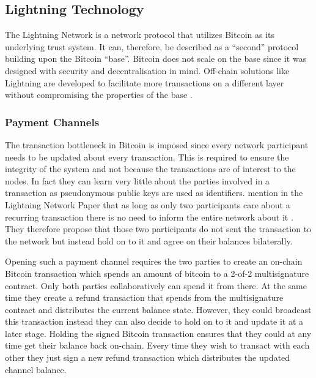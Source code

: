 \documentclass[final]{fhnwreport}       %
\begin{document}
\subsection{Lightning Technology}
The Lightning Network is a network protocol that utilizes Bitcoin as its underlying trust system. It can, therefore, be described as a ``\gls{second}'' protocol building upon the Bitcoin ``\gls{base}''. Bitcoin does not scale on the \gls{base} since it was designed with security and decentralisation in mind. Off-chain solutions like Lightning are developed to facilitate more transactions on a different layer without compromising the properties of the \gls{base} \citep{poon_bitcoin_2016}.

\subsubsection{Payment Channels}
The transaction bottleneck in Bitcoin is imposed since every network participant needs to be updated about every transaction. This is required to ensure the integrity of the system and not because the transactions are of interest to the nodes. In fact they can learn very little about the parties involved in a transaction as pseudonymous public keys are used as identifiers. \citeauthor{poon_bitcoin_2016} mention in the Lightning Network Paper that as long as only two participants care about a recurring transaction there is no need to inform the entire network about it \citep{poon_bitcoin_2016}. They therefore propose that those two participants do not sent the transaction to the network but instead hold on to it and agree on their balances bilaterally. 

Opening such a payment channel requires the two parties to create an on-chain Bitcoin transaction which spends an amount of bitcoin to a 2-of-2 multisignature contract. Only both parties collaboratively can spend it from there. At the same time they create a refund transaction that spends from the multisignature contract and distributes the current balance state. However, they could broadcast this transaction instead they can also decide to hold on to it and update it at a later stage. Holding the signed Bitcoin transaction ensures that they could at any time get their balance back on-chain. Every time they wish to transact with each other they just sign a new refund transaction which distributes the updated channel balance.
\end{document}
